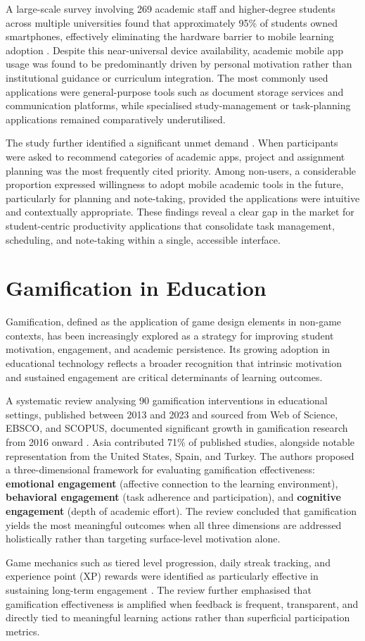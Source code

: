 A large-scale survey involving 269 academic staff and higher-degree students across multiple universities found that approximately 95\% of students owned smartphones, effectively eliminating the hardware barrier to mobile learning adoption \citep{Hinze2023}. Despite this near-universal device availability, academic mobile app usage was found to be predominantly driven by personal motivation rather than institutional guidance or curriculum integration. The most commonly used applications were general-purpose tools such as document storage services and communication platforms, while specialised study-management or task-planning applications remained comparatively underutilised.

The study further identified a significant unmet demand \citep{Hinze2023}. When participants were asked to recommend categories of academic apps, project and assignment planning was the most frequently cited priority. Among non-users, a considerable proportion expressed willingness to adopt mobile academic tools in the future, particularly for planning and note-taking, provided the applications were intuitive and contextually appropriate. These findings reveal a clear gap in the market for student-centric productivity applications that consolidate task management, scheduling, and note-taking within a single, accessible interface.

\section{Gamification in Education}
Gamification, defined as the application of game design elements in non-game contexts, has been increasingly explored as a strategy for improving student motivation, engagement, and academic persistence. Its growing adoption in educational technology reflects a broader recognition that intrinsic motivation and sustained engagement are critical determinants of learning outcomes.

A systematic review analysing 90 gamification interventions in educational settings, published between 2013 and 2023 and sourced from Web of Science, EBSCO, and SCOPUS, documented significant growth in gamification research from 2016 onward \citep{RamirezRuiz2024}. Asia contributed 71\% of published studies, alongside notable representation from the United States, Spain, and Turkey. The authors proposed a three-dimensional framework for evaluating gamification effectiveness: \textbf{emotional engagement} (affective connection to the learning environment), \textbf{behavioral engagement} (task adherence and participation), and \textbf{cognitive engagement} (depth of academic effort). The review concluded that gamification yields the most meaningful outcomes when all three dimensions are addressed holistically rather than targeting surface-level motivation alone.

Game mechanics such as tiered level progression, daily streak tracking, and experience point (XP) rewards were identified as particularly effective in sustaining long-term engagement \citep{RamirezRuiz2024}. The review further emphasised that gamification effectiveness is amplified when feedback is frequent, transparent, and directly tied to meaningful learning actions rather than superficial participation metrics.

